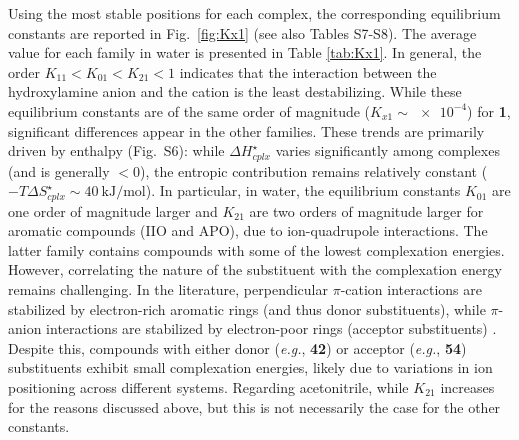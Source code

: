 \documentclass[review,preprint]{elsarticle}
\begin{document}
Using the most stable positions for each complex, the corresponding equilibrium constants are reported in Fig.~\ref{fig:Kx1} (see also Tables S7-S8). The average value for each family in water is presented in Table \ref{tab:Kx1}. In general, the order $K_{11} < K_{01} < K_{21} < 1$ indicates that the interaction between the hydroxylamine anion and the cation is the least destabilizing. While these equilibrium constants are of the same order of magnitude ($K_{x1} \sim \num{e-4}$) for \textbf{1}, significant differences appear in the other families.  These trends are primarily driven by enthalpy (Fig.~S6): while $\Delta H^\star_{cplx}$ varies significantly among complexes (and is generally $<0$), the entropic contribution remains relatively constant ($-T\Delta S^\star_{cplx} \sim \SI{40}{\kilo\joule\per\mole}$).
In particular, in water, the equilibrium constants $K_{01}$ are one order of magnitude larger and $K_{21}$ are two orders of magnitude larger for aromatic compounds (IIO and APO), due to ion-quadrupole interactions. The latter family contains compounds with some of the lowest complexation energies.  However, correlating the nature of the substituent with the complexation energy remains challenging. In the literature, perpendicular $\pi$-cation interactions are stabilized by electron-rich aromatic rings (and thus donor substituents), while $\pi$-anion interactions are stabilized by electron-poor rings (acceptor substituents) \cite{pappFourFacesInteraction2017}. Despite this, compounds with either donor (\textit{e.g.}, \textbf{42}) or acceptor (\textit{e.g.}, \textbf{54}) substituents exhibit small complexation energies, likely due to variations in ion positioning across different systems. Regarding acetonitrile, while $K_{21}$ increases for the reasons discussed above, but this is not necessarily the case for the other constants. 
\end{document}
